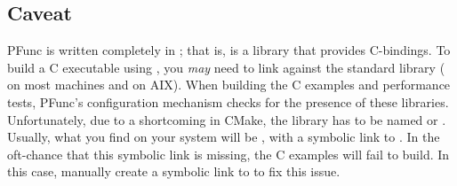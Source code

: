 %
\subsection{Caveat}
PFunc is written completely in \Cpp{}; that is,  is a \Cpp{}
library that provides C-bindings. 
%
To build a C executable using , you \textit{may}  
need to link against the \Cpp{} standard library ( on most 
machines and  on AIX).
%
When building the C examples and performance tests, PFunc's configuration
mechanism checks for the presence of these libraries. 
%
Unfortunately, due to a shortcoming in CMake, the library has to be named
 or . 
%
Usually, what you find on your system will be , with a
symbolic link to . 
%
In the oft-chance that this symbolic link is missing, the C
examples will fail to build. 
%
In this case, manually create a symbolic link to  to fix this 
issue.
